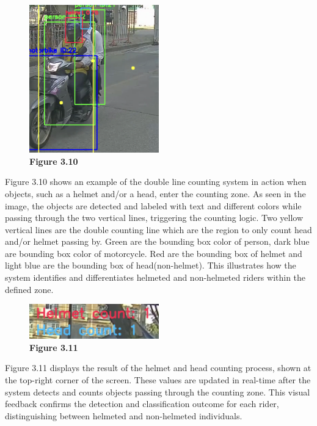 \begin{figure}[H] %
	\centering
	\includegraphics[width=0.5\textwidth]{headhel2.png}
	\vspace{0.5em}
	\caption*{\textbf{Figure 3.10}}
\end{figure}

\noindent\hspace{2.5em}Figure 3.10 shows an example of the double line counting system in action when objects, such as a helmet and/or a head, enter the counting zone. As seen in the image, the objects are detected and labeled with text and different colors while passing through the two vertical lines, triggering the counting logic. Two yellow vertical lines are the double counting line which are the region to only count head and/or helmet passing by. Green are the bounding box color of person, dark blue are bounding box color of motorcycle. Red are the bounding box of helmet and light blue are the bounding box of head(non-helmet). This illustrates how the system identifies and differentiates helmeted and non-helmeted riders within the defined zone.

\begin{figure}[H] %
	\centering
	\includegraphics[width=0.5\textwidth]{headhel3.png}
	\vspace{0.5em}
	\caption*{\textbf{Figure 3.11}}
\end{figure}

\noindent\hspace{2.5em}Figure 3.11 displays the result of the helmet and head counting process, shown at the top-right corner of the screen. These values are updated in real-time after the system detects and counts objects passing through the counting zone. This visual feedback confirms the detection and classification outcome for each rider, distinguishing between helmeted and non-helmeted individuals.




